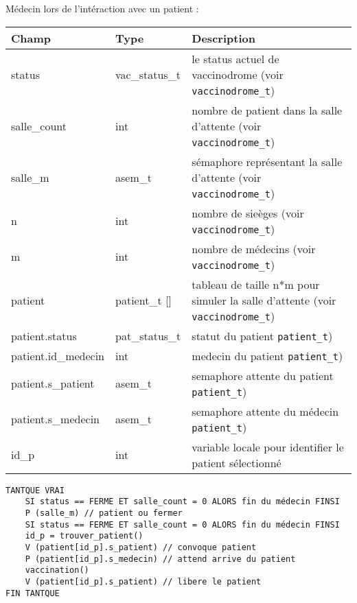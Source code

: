 \documentclass[a4paper]{article}
\begin{document}
\bigskip Médecin lors de l'intéraction avec un patient :
\bigskip \newline
\begin{tabularx}{\linewidth}{|l|l|>{\strut}X|}
  \hline%
  Champ & Type & Description \\ \hline%
  status & vac\_status\_t & le status actuel de vaccinodrome (voir \texttt{vaccinodrome\_t}) \\ \hline%
  salle\_count & int & nombre de patient dans la salle d'attente (voir \texttt{vaccinodrome\_t}) \\ \hline%
  salle\_m & asem\_t & sémaphore représentant la salle d'attente (voir \texttt{vaccinodrome\_t}) \\ \hline%
  n & int & nombre de sieèges (voir \texttt{vaccinodrome\_t}) \\ \hline%
  m & int & nombre de médecins (voir \texttt{vaccinodrome\_t}) \\ \hline%
  patient & patient\_t [] & tableau de taille n*m pour simuler la salle d’attente (voir \texttt{vaccinodrome\_t})  \\ \hline%
  patient.status & pat\_status\_t & statut du patient \texttt{patient\_t})\\ \hline%
  patient.id\_medecin & int & medecin du patient \texttt{patient\_t})\\ \hline%
  patient.s\_patient & asem\_t & semaphore attente du patient \texttt{patient\_t}) \\ \hline%
  patient.s\_medecin & asem\_t & semaphore attente du médecin \texttt{patient\_t})\\ \hline%
  id\_p & int & variable locale pour identifier le patient sélectionné \\ \hline%
\end{tabularx}

\begin{verbatim}
TANTQUE VRAI
    SI status == FERME ET salle_count = 0 ALORS fin du médecin FINSI
    P (salle_m) // patient ou fermer
    SI status == FERME ET salle_count = 0 ALORS fin du médecin FINSI
    id_p = trouver_patient()
    V (patient[id_p].s_patient) // convoque patient
    P (patient[id_p].s_medecin) // attend arrive du patient
    vaccination()
    V (patient[id_p].s_patient) // libere le patient
FIN TANTQUE
\end{verbatim}
\end{document}
